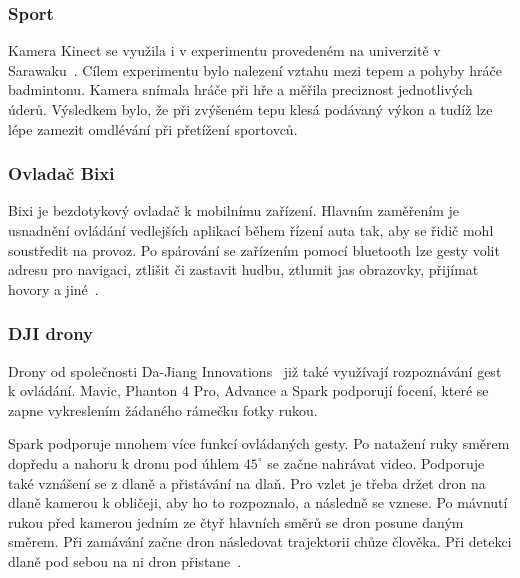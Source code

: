 \subsubsection{Sport}
Kamera Kinect se využila i v experimentu provedeném na univerzitě v Sarawaku~\cite{22}. Cílem experimentu bylo nalezení vztahu mezi tepem a pohyby hráče badmintonu. Kamera snímala hráče při hře a měřila preciznost jednotlivých úderů. Výsledkem bylo, že při zvýšeném tepu klesá podávaný výkon a tudíž lze lépe zamezit omdlévání při přetížení sportovců.

\subsubsection{Ovladač Bixi}
Bixi je bezdotykový ovladač k mobilnímu zařízení. Hlavním zaměřením je usnadnění ovládání vedlejších aplikací během řízení auta tak, aby se řidič mohl soustředit na provoz. Po spárování se zařízením pomocí bluetooth lze gesty volit adresu pro navigaci, ztlišit či zastavit hudbu, ztlumit jas obrazovky, přijímat hovory a jiné~\cite{bixi}.

\subsubsection{DJI drony}
Drony od společnosti Da-Jiang Innovations~\cite{dji} již také využívají rozpoznávání gest k ovládání. Mavic, Phanton 4 Pro, Advance  a Spark podporují focení, které se zapne vykreslením žádaného rámečku fotky rukou.

Spark podporuje mnohem více funkcí ovládaných gesty. Po natažení ruky směrem dopředu a nahoru k dronu pod úhlem $ 45^\circ $ se začne nahrávat video. Podporuje také vznášení se z dlaně a přistávání na dlaň. Pro vzlet je třeba držet dron na dlaně kamerou k obličeji, aby ho to rozpoznalo, a následně se vznese. Po mávnutí rukou před kamerou jedním ze čtyř hlavních směrů se dron posune daným směrem. Při zamávání začne dron následovat trajektorii chůze člověka. Při detekci dlaně pod sebou na ni dron přistane~\cite{heliguy}.

\endinput
